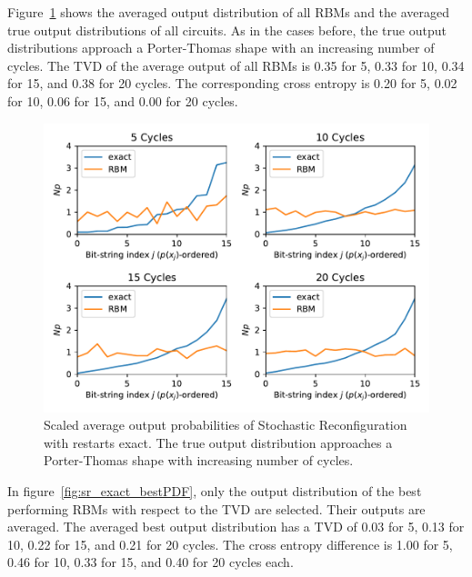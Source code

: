Figure~\ref{fig:sr_exact_avgPDF} shows the averaged output distribution of all RBMs and
the averaged true output distributions of all circuits. As in the cases before, the 
true output distributions approach a Porter-Thomas shape with an increasing number of cycles.
The TVD of the average output of all RBMs 
is 0.35 for 5, 0.33 for 10, 0.34 for 15, and 0.38 for 20 cycles. The corresponding cross entropy is 
0.20 for 5, 0.02 for 10, 0.06 for 15, and 0.00 for 20 cycles.

\begin{figure}[H]
  \centering
  \includegraphics[width=\textwidth]{figures/results/SR-restarts-not-learned/avgPDF.pdf}
  \caption[Scaled Average Output Probabilities of All RBMs Trained with Stochastic Reconfiguration with Random Restarts and $CZ$ Gates Applied Exactly]{
    Scaled average output probabilities of Stochastic Reconfiguration with restarts exact. The true 
    output distribution approaches a Porter-Thomas shape with increasing number of cycles.}
  \label{fig:sr_exact_avgPDF}
\end{figure}

In figure~\ref{fig:sr_exact_bestPDF}, only the output distribution of the best performing RBMs with respect to the 
TVD are selected. Their outputs are averaged. The averaged best output distribution 
has a TVD of 0.03 for 5, 0.13 for 10, 0.22 for 15, and 0.21 for 20 
cycles. The cross entropy difference is 1.00 for 5, 0.46 for 10, 0.33 for 15, and 0.40 for 20 cycles each. 


